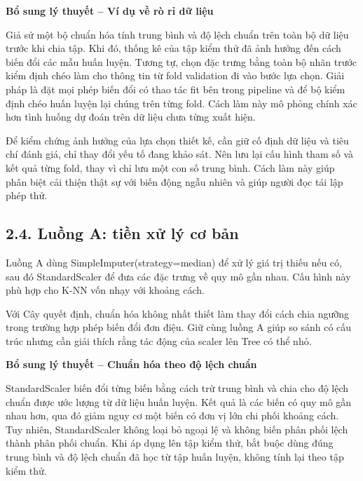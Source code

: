 \documentclass[12pt,a4paper,oneside]{article}
\begin{document}
\par\noindent\textbf{Bổ sung lý thuyết -- Ví dụ về rò rỉ dữ liệu}\par
Giả sử một bộ chuẩn hóa tính trung bình và độ lệch chuẩn trên toàn bộ dữ liệu trước khi chia tập. Khi đó, thống kê của tập kiểm thử đã ảnh hưởng đến cách biến đổi các mẫu huấn luyện. Tương tự, chọn đặc trưng bằng toàn bộ nhãn trước kiểm định chéo làm cho thông tin từ fold validation đi vào bước lựa chọn. Giải pháp là đặt mọi phép biến đổi có thao tác fit bên trong pipeline và để bộ kiểm định chéo huấn luyện lại chúng trên từng fold. Cách làm này mô phỏng chính xác hơn tình huống dự đoán trên dữ liệu chưa từng xuất hiện.\par

Để kiểm chứng ảnh hưởng của lựa chọn thiết kế, cần giữ cố định dữ liệu và tiêu chí đánh giá, chỉ thay đổi yếu tố đang khảo sát. Nên lưu lại cấu hình tham số và kết quả từng fold, thay vì chỉ lưu một con số trung bình. Cách làm này giúp phân biệt cải thiện thật sự với biến động ngẫu nhiên và giúp người đọc tái lập phép thử.\par

\subsection*{2.4. Luồng A: tiền xử lý cơ bản}

Luồng A dùng SimpleImputer(strategy=median) để xử lý giá trị thiếu nếu
có, sau đó StandardScaler để đưa các đặc trưng về quy mô gần nhau. Cấu
hình này phù hợp cho K-NN vốn nhạy với khoảng cách.

Với Cây quyết định, chuẩn hóa không nhất thiết làm thay đổi cách chia
ngưỡng trong trường hợp phép biến đổi đơn điệu. Giữ cùng luồng A giúp so
sánh có cấu trúc nhưng cần giải thích rằng tác động của scaler lên Tree
có thể nhỏ.


\par\noindent\textbf{Bổ sung lý thuyết -- Chuẩn hóa theo độ lệch chuẩn}\par
StandardScaler biến đổi từng biến bằng cách trừ trung bình và chia cho độ lệch chuẩn được ước lượng từ dữ liệu huấn luyện. Kết quả là các biến có quy mô gần nhau hơn, qua đó giảm nguy cơ một biến có đơn vị lớn chi phối khoảng cách. Tuy nhiên, StandardScaler không loại bỏ ngoại lệ và không biến phân phối lệch thành phân phối chuẩn. Khi áp dụng lên tập kiểm thử, bắt buộc dùng đúng trung bình và độ lệch chuẩn đã học từ tập huấn luyện, không tính lại theo tập kiểm thử.\par
\end{document}
